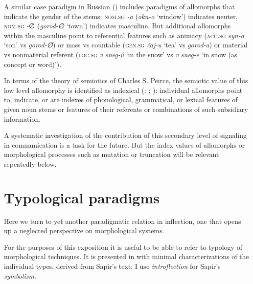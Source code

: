 \documentclass[output=paper, colorlinks,citecolor=brown]{langsci/langscibook}
\begin{document}
\begin{sloppypar}
A similar case paradigm in Russian () includes paradigms of allomorphs that indicate the gender of the stems: \textsc{nom.sg} \textit{-o} (\textit{okn-o} ‘window') indicates neuter, \textsc{nom.sg} -∅ (\textit{gorod-∅} ‘town') indicates masculine. But additional allomorphs within the masculine point to referential features such as animacy (\textsc{acc.sg} \textit{syn-a} ‘son' vs \textit{gorod-∅}) or mass vs countable (\textsc{gen.sg} \textit{čaj-u} ‘tea' vs \textit{gorod-a}) or material vs nonmaterial referent (\textsc{loc.sg} \textit{v sneg-ú} ‘in the snow' vs \textit{v sneg-e} ‘in snow (as concept or word)'). 
\end{sloppypar}

In terms of the theory of semiotics of Charles S. Peirce, the semiotic value of this low level allomorphy is identified as indexical (\citealt{Shapiro1969}; \citealt{Anttila1972, Anttila1989}; \citealt{Andersen1980, Andersen2020}): individual allomorphs point to, indicate, or are indexes of phonological, grammatical, or lexical features of given noun stems or features of their referents or combinations of such subsidiary information.\largerpage

A systematic investigation of the contribution of this secondary level of signaling in communication is a task for the future. But the index values of allomorphs or morphological processes such as mutation or truncation will be relevant repeatedly below.

\section{Typological paradigms} \label{andersen_sec2}

Here we turn to yet another paradigmatic relation in inflection, one that opens up a neglected perspective on morphological systems.

For the purposes of this exposition it is useful to be able to refer to  typology of morphological techniques. It is presented in  with minimal characterizations of the individual types, derived from Sapir's text; I use \textit{introflection} for Sapir's \textit{symbolism}. 
\end{document}

